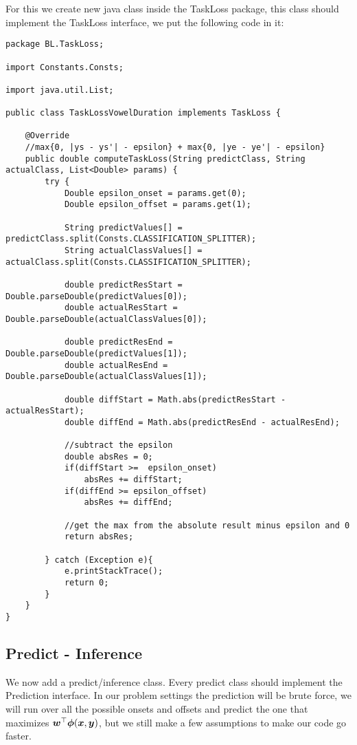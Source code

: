 \documentclass[11pt, oneside]{article}   	%
\begin{document}
For this we create new java class inside the TaskLoss package, this class should implement the TaskLoss interface, we put the following code in it:
\begin{lstlisting}
package BL.TaskLoss;

import Constants.Consts;

import java.util.List;

public class TaskLossVowelDuration implements TaskLoss {

	@Override
    //max{0, |ys - ys'| - epsilon} + max{0, |ye - ye'| - epsilon}
	public double computeTaskLoss(String predictClass, String actualClass, List<Double> params) {
        try {
            Double epsilon_onset = params.get(0);
            Double epsilon_offset = params.get(1);

            String predictValues[] = predictClass.split(Consts.CLASSIFICATION_SPLITTER);
            String actualClassValues[] = actualClass.split(Consts.CLASSIFICATION_SPLITTER);

            double predictResStart = Double.parseDouble(predictValues[0]);
            double actualResStart = Double.parseDouble(actualClassValues[0]);

            double predictResEnd = Double.parseDouble(predictValues[1]);
            double actualResEnd = Double.parseDouble(actualClassValues[1]);

            double diffStart = Math.abs(predictResStart - actualResStart);
            double diffEnd = Math.abs(predictResEnd - actualResEnd);

            //subtract the epsilon
            double absRes = 0;
            if(diffStart >=  epsilon_onset)
                absRes += diffStart;
            if(diffEnd >= epsilon_offset)
                absRes += diffEnd;

            //get the max from the absolute result minus epsilon and 0
            return absRes;

        } catch (Exception e){
            e.printStackTrace();
            return 0;
        }
	}
}\end{lstlisting}

\subsection{Predict - Inference}
We now add a predict/inference class. Every predict class should implement the Prediction interface. In our problem settings the prediction will be brute force, we will run over all the possible onsets and offsets and predict the one that maximizes $\bm{w}^\top \bm{\phi}(\bm{x}, \bm{y})$, but we still make a few assumptions to make our code go faster.
\end{document}
